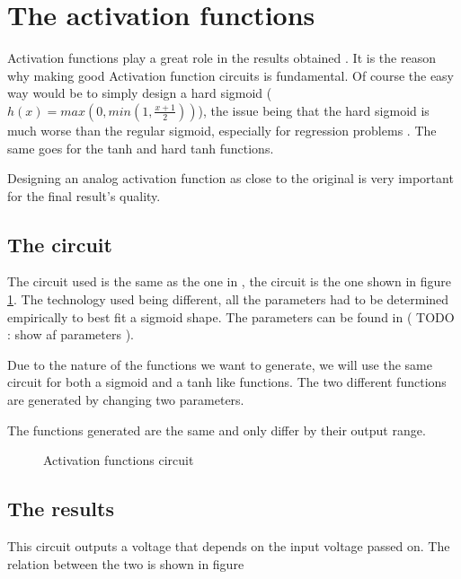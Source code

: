 \section{The activation functions}
\label{sec:af}

Activation functions play a great role in the results obtained \cite{af}. It is the reason why making good Activation function circuits is fundamental. Of course the easy way would be to simply design a hard sigmoid ($h(x)=max(0,min(1,\frac{x+1}{2}))$), the issue being that the hard sigmoid is much worse than the regular sigmoid, especially for regression problems \cite{hardSigm}. The same goes for the \ac{tanh} and hard \ac{tanh} functions.

Designing an analog activation function as close to the original is very important for the final result's quality.


\subsection{The circuit}

The circuit used is the same as the one in \cite{thesisRef}, the circuit is the one shown in figure \ref{fig:afCircuit}. The technology used being different, all the parameters had to be determined empirically to best fit a sigmoid shape. The parameters can be found in ( TODO : show af parameters ).

Due to the nature of the functions we want to generate, we will use the same circuit for both a sigmoid and a \ac{tanh} like functions. The two different functions are generated by changing two parameters.

The functions generated are the same and only differ by their output range.

\begin{figure}[H]
  \centering
  
  \caption{Activation functions circuit}
  \label{fig:afCircuit}
\end{figure}

\subsection{The results}

This circuit outputs a voltage that depends on the input voltage passed on. The relation between the two is shown in figure

